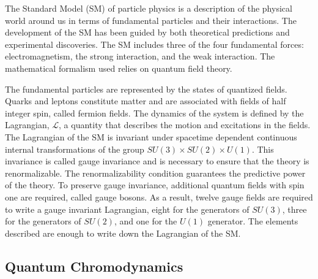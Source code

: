 The Standard Model (SM) of particle physics is a description of the physical world around us in terms of fundamental particles 
and their interactions. 
The development of the SM has been guided by both theoretical predictions and experimental discoveries.
The SM includes three of the four fundamental forces: electromagnetism, the strong interaction, and the weak interaction.
The mathematical formalism used relies on quantum field theory. %

The fundamental particles are represented by the states of quantized fields.
Quarks and leptons constitute matter and are associated with fields of half integer spin, called fermion fields.
The dynamics of the system is defined by the Lagrangian, $\mathcal{L}$, a quantity that describes the motion and excitations 
in the fields.
The Lagrangian of the SM is invariant under spacetime dependent continuous internal transformations of the group 
$ SU\left(3\right) \times SU\left(2\right) \times U\left(1\right) $.
This invariance is called gauge invariance and is necessary to ensure that the theory is renormalizable.
The renormalizability condition guarantees the predictive power of the theory.
To preserve gauge invariance, additional quantum fields with spin one are required, called gauge bosons.
As a result, twelve gauge fields are required to write a gauge invariant Lagrangian, 
 eight for the generators of $ SU\left(3\right) $, three for the generators of $SU\left(2\right)$, 
and one for the $U\left(1\right)$ generator.
The elements described are enough to write down the Lagrangian of the SM.

\subsection{Quantum Chromodynamics}

